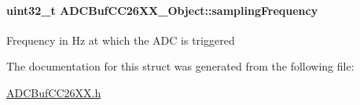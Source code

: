 \paragraph[{sampling\+Frequency}]{\setlength{\rightskip}{0pt plus 5cm}uint32\+\_\+t A\+D\+C\+Buf\+C\+C26\+X\+X\+\_\+\+Object\+::sampling\+Frequency}\label{struct_a_d_c_buf_c_c26_x_x___object_aa48daa7926823e87e732ea2bc4e70911}
Frequency in Hz at which the A\+D\+C is triggered 

The documentation for this struct was generated from the following file\+:\begin{DoxyCompactItemize}
\item 
\hyperlink{_a_d_c_buf_c_c26_x_x_8h}{A\+D\+C\+Buf\+C\+C26\+X\+X.\+h}\end{DoxyCompactItemize}
